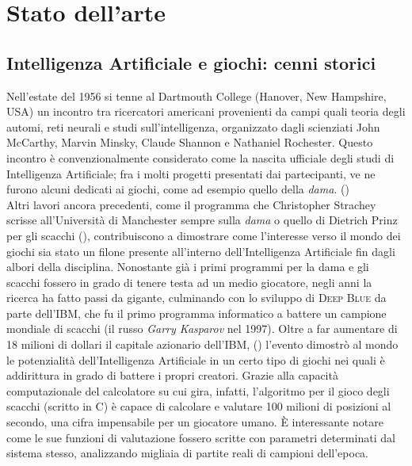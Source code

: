 \chapter*{Stato dell'arte}
\graphicspath{{Chapter2/Chapter2Figs/PNG/}{Chapter2/Chapter2Figs/PDF/}{Chapter2/Chapter2Figs/}}

\section{Intelligenza Artificiale e giochi: cenni storici}

Nell'estate del 1956 si tenne al Dartmouth College (Hanover, New Hampshire, USA) un incontro tra ricercatori americani provenienti da campi quali teoria degli automi, reti neurali e studi sull'intelligenza, organizzato dagli scienziati John McCarthy, Marvin Minsky, Claude Shannon e Nathaniel Rochester.
Questo incontro è convenzionalmente considerato come la nascita ufficiale degli studi di Intelligenza Artificiale; fra i molti progetti presentati dai partecipanti, ve ne furono alcuni dedicati ai giochi, come ad esempio quello della \emph{dama}. (\cite{randw})\\
Altri lavori ancora precedenti, come il programma che Christopher Strachey scrisse all'Università di Manchester sempre sulla \emph{dama} o quello di Dietrich Prinz per gli scacchi (\cite{historyofcomputing}), contribuiscono a dimostrare come l'interesse verso il mondo dei giochi sia stato un filone presente all'interno dell'Intelligenza Artificiale fin dagli albori della disciplina.
Nonostante già i primi programmi per la dama e gli scacchi fossero in grado di tenere testa ad un medio giocatore, negli anni la ricerca ha fatto passi da gigante, culminando con lo sviluppo di \textsc{Deep Blue} da parte dell'\textsc{IBM}, che fu il primo programma informatico a battere un campione mondiale di scacchi (il russo \emph{Garry Kasparov} nel 1997).
Oltre a far aumentare di 18 milioni di dollari il capitale azionario dell'\textsc{IBM}, (\cite{randw}) l'evento dimostrò al mondo le potenzialità dell'Intelligenza Artificiale in un certo tipo di giochi nei quali è addirittura in grado di battere i propri creatori.
Grazie alla capacità computazionale del calcolatore su cui gira, infatti, l’algoritmo per il gioco degli scacchi (scritto in C) è capace di calcolare e valutare 100 milioni di posizioni al secondo, una cifra impensabile per un giocatore umano.
È interessante notare come le sue funzioni di valutazione fossero scritte con parametri determinati dal sistema stesso, analizzando migliaia di partite reali di campioni dell'epoca.\\
